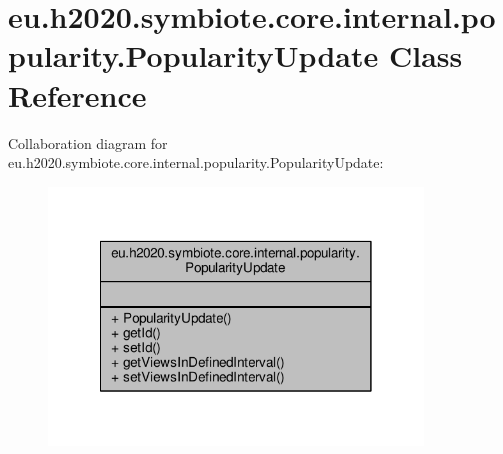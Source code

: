\hypertarget{classeu_1_1h2020_1_1symbiote_1_1core_1_1internal_1_1popularity_1_1PopularityUpdate}{}\section{eu.\+h2020.\+symbiote.\+core.\+internal.\+popularity.\+Popularity\+Update Class Reference}
\label{classeu_1_1h2020_1_1symbiote_1_1core_1_1internal_1_1popularity_1_1PopularityUpdate}


Collaboration diagram for eu.\+h2020.\+symbiote.\+core.\+internal.\+popularity.\+Popularity\+Update\+:\nopagebreak
\begin{figure}[H]
\begin{center}
\leavevmode
\includegraphics[width=282pt]{classeu_1_1h2020_1_1symbiote_1_1core_1_1internal_1_1popularity_1_1PopularityUpdate__coll__graph}
\end{center}
\end{figure}
